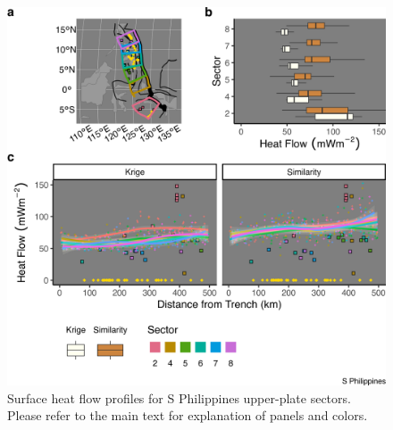 \begin{figure}[htbp]

{\centering \includegraphics[width=1\linewidth,]{assets/figs/chpt3/SPhilippinesUpperPlate} 

}

\caption[Surface heat flow profiles for S Philippines upper-plate sectors]{Surface heat flow profiles for S Philippines upper-plate sectors. Please refer to the main text for explanation of panels and colors.}\label{fig:sPhilippinesUpper}
\end{figure}

